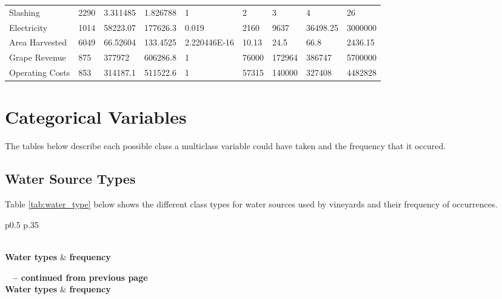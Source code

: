 \documentclass[review,12pt,authoryear]{elsarticle}
\begin{document}
\begin{linenumbers}
\begin{table}[]
{\begin{tabular}{@{}lllllllll@{}}
  Slashing & 2290 & 3.311485 & 1.826788 & 1 & 2 & 3 & 4 & 26 \\
  Electricity & 1014 & 58223.07 & 177626.3 & 0.019 & 2160 & 9637 & 36498.25 & 3000000 \\
  Area Harvested & 6049 & 66.52604 & 133.4525 & 2.220446E-16 & 10.13 & 24.5 & 66.8 & 2436.15 \\
  Grape Revenue & 875 & 377972 & 606286.8 & 1 & 76000 & 172964 & 386747 & 5700000 \\
  Operating Costs & 853 & 314187.1 & 511522.6 & 1 & 57315 & 140000 & 327408 & 4482828 \\ \bottomrule
  \end{tabular}}
  \end{table}
\clearpage

  \section{Categorical Variables}
  The tables below describe each possible class a multiclass variable could have taken and the frequency that it occured.
  \subsection{Water Source Types}
  Table \ref{tab:water_type} below shows the different class types for water sources used by vineyards and their frequency of occurrences.

\begin{center}
  \begin{longtable}{p{0.5\linewidth} p{.35\linewidth}}
    \caption{Frequency and class types of water types used by vineyards.}\label{tab:water_type} \\
  
  \hline \textbf{Water types} & \textbf{frequency}\\ \hline 
  \endfirsthead
  
  {{\bfseries \tablename\ \thetable{} -- continued from previous page}} \\
  \hline \textbf{Water types} & \textbf{frequency} \\ \hline 
  \endhead
  
  \hline {} \\ \hline
  \endfoot
  

\end{longtable}
\end{center}
\end{linenumbers}
\end{document}
